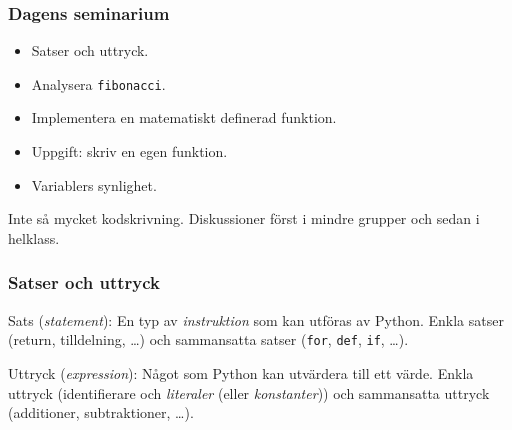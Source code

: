 \documentclass{beamer}
\begin{document}
  \begin{frame}
    \frametitle{Dagens seminarium}

    \begin{itemize}
      \item Satser och uttryck.
      \item Analysera \texttt{fibonacci}.
      \item Implementera en matematiskt definerad funktion.
      \item Uppgift: skriv en egen funktion.
      \item Variablers synlighet.
    \end{itemize}

    Inte så mycket kodskrivning. Diskussioner först i mindre grupper och sedan i
    helklass.

  \end{frame}

  \begin{frame}
    \frametitle{Satser och uttryck}

    Sats (\textit{statement}): En typ av \emph{instruktion} som kan utföras av
    Python. Enkla satser (return, tilldelning, \dots) och sammansatta satser (\texttt{for},
    \texttt{def}, \texttt{if}, \dots).

    Uttryck (\textit{expression}): Något som Python kan utvärdera till ett
    värde. Enkla uttryck (identifierare och \textit{literaler} (eller
    \textit{konstanter})) och sammansatta uttryck (additioner, subtraktioner,
    \dots).


  \end{frame}
\end{document}
